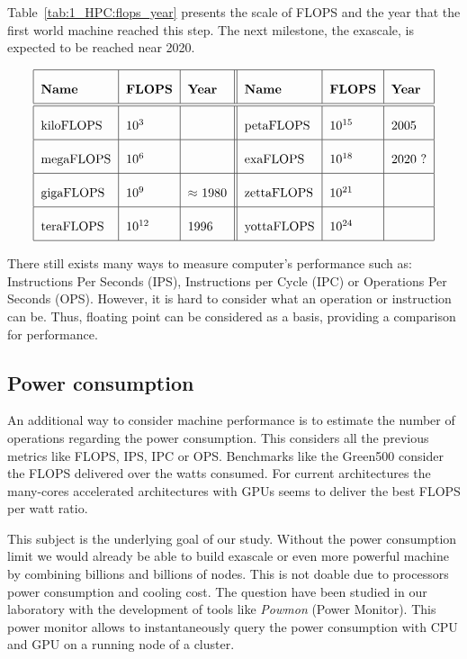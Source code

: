 Table~\ref{tab:1_HPC:flops_year} presents the scale of FLOPS and the year that the first world machine reached this step.
The next milestone, the exascale, is expected to be reached near 2020.  

\begin{table}
\[\arraycolsep=1.4pt\def\arraystretch{2.2}
\begin{tabular}{| l | l | l || l | l | l |}
\hline
	\textbf{Name} & \textbf{FLOPS} & \textbf{Year} & \textbf{Name} & \textbf{FLOPS} & \textbf{Year} \\
	\hline
	\hline
	kiloFLOPS & $10^{3}$ & & petaFLOPS  & $10^{15}$ & 2005 \\ 
	\hline
	megaFLOPS & $10^{6}$ & & exaFLOPS   & $10^{18}$ & 2020 ? \\
	\hline
	gigaFLOPS & $10^{9}$ & $\approx$ 1980  & zettaFLOPS & $10^{21}$ & \\
	\hline
	teraFLOPS & $10^{12}$ & 1996 & yottaFLOPS & $10^{24}$ & \\
	\hline
	\end{tabular}
	\]
	\caption[Scales and years of FLOPS scale]{Floating-point Operation per Second scales name and values over the years in HPC.}
	\label{tab:1_HPC:flops_year}
\end{table}


There still exists many ways to measure computer's performance such as: Instructions Per Seconds (IPS), Instructions per Cycle (IPC) or Operations Per Seconds (OPS).
However, it is hard to consider what an operation or instruction can be.
Thus, floating point can be considered as a basis, providing a comparison for performance. 


\subsection{Power consumption}
An additional way to consider machine performance is to estimate the number of operations regarding the power consumption. 
This considers all the previous metrics like FLOPS, IPS, IPC or OPS. 
Benchmarks like the Green500 consider the FLOPS delivered over the watts consumed. 
For current architectures the many-cores accelerated architectures with GPUs seems to deliver the best FLOPS per watt ratio.

This subject is the underlying goal of our study. 
Without the power consumption limit we would already be able to build exascale or even more powerful machine by combining billions and billions of nodes. 
This is not doable due to processors power consumption and cooling cost.
The question have been studied in our laboratory with the development of tools like \textit{Powmon} (Power Monitor).
This power monitor allows to instantaneously query the power consumption with CPU and GPU on a running node of a cluster. 

